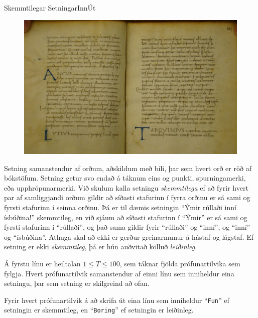 \begin{problem}{Skemmtilegar Setningar}{Inn}{Út}{~}{~}

	\begin{figure}
		\vspace{-25pt}
		\begin{center}
			\includegraphics[scale=0.2]{../SkemmtilegarSetningar/book.jpg}
		\end{center}
		\vspace{-30pt}
	\end{figure}

	Setning samanstendur af orðum, aðskildum með bili, þar sem hvert orð er röð af bókstöfum. Setning getur svo endað á táknum eins og punkti, spurningamerki, eða upphrópunarmerki. Við skulum kalla setningu \textit{skemmtilega} ef að fyrir hvert par af samliggjandi orðum gildir að síðasti stafurinn í fyrra orðinu er sá sami og fyrsti stafurinn í seinna orðinu. Þá er til dæmis setningin "`Ýmir rúllaði inní ísbúðina!"' skemmtileg, en við sjáum að síðasti stafurinn í "`Ýmir"' er sá sami og fyrsti stafurinn í "`rúllaði"', og það sama gildir fyrir "`rúllaði"' og "`inní"', og "`inní"' og "`ísbúðina"'. Athuga skal að ekki er gerður greinarmunur á hástaf og lágstaf. Ef setning er ekki \textit{skemmtileg}, þá er hún auðvitað kölluð \textit{leiðinleg}.
	
	\Input

		Á fyrstu línu er heiltalan $1 \leq T \leq 100$, sem táknar fjölda prófunartilvika sem fylgja. Hvert prófunartilvik samanstendur af einni línu sem inniheldur eina setningu, þar sem setning er skilgreind að ofan.

	\Output

		Fyrir hvert prófunartilvik á að skrifa út eina línu sem inniheldur "`\texttt{Fun}"' ef setningin er skemmtileg, en "`\texttt{Boring}"' ef setningin er leiðinleg.

	\Examples

		\begin{example}
		\end{example}

\end{problem}